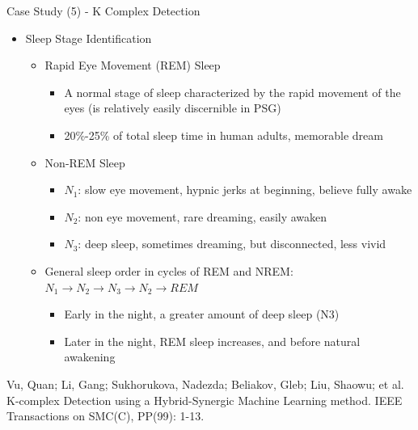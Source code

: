 \documentclass[
 size=14pt,
 paper=smartboard,  %
 mode=present, 		%
 display=slides, 	%
 style=tuliplab,  	%
 pauseslide,
 fleqn,leqno]{powerdot}
\begin{document}
\begin{slide}[toc=,bm=]{Case Study (5) - K Complex Detection}
\begin{itemize}
\item Sleep Stage Identification
\begin{itemize}
\item<2->
Rapid Eye Movement (REM) Sleep
\begin{itemize}
\item<2->
A normal stage of sleep characterized by the rapid movement of the eyes
(is relatively easily discernible in PSG)
\item<2->
20\%-25\% of total sleep time in human adults, memorable dream
\end{itemize}
\item<3->
{Non-REM Sleep}
\begin{itemize}
\item<3->
\textbf{$N_1$}: slow eye movement, hypnic jerks at beginning, believe fully awake
\item<3->
\textbf{$N_2$}: non eye movement, rare dreaming, easily awaken
\item<3->
\textbf{$N_3$}: deep sleep, sometimes dreaming, but disconnected, less vivid
\end{itemize}
\item<4->
General sleep order in cycles of REM and NREM:
$N_1 \rightarrow N_2 \rightarrow N_3 \rightarrow N_2 \rightarrow REM$
\begin{itemize}
\item<4->
Early in the night, a greater amount of deep sleep (N3)
\item<4->
Later in the night, REM sleep increases, and before natural awakening
\end{itemize}
\end{itemize}
\end{itemize}
\footnotesize{Vu, Quan; Li, Gang; Sukhorukova, Nadezda;
Beliakov, Gleb; Liu, Shaowu; et al.
K-complex Detection using a Hybrid-Synergic Machine Learning method.
IEEE Transactions on SMC(C), PP(99): 1-13.}
\end{slide}
\end{document}

